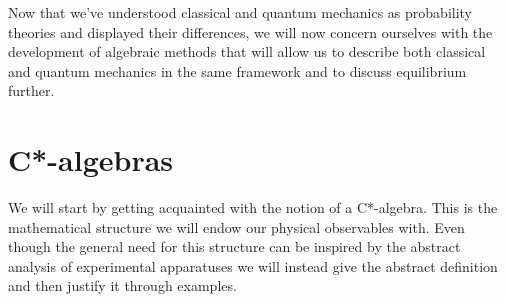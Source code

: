 Now that we've understood classical and quantum mechanics as probability theories and displayed their differences, we will now concern ourselves with the development of algebraic methods that will allow us to describe both classical and quantum mechanics in the same framework and to discuss equilibrium further.
 
\section{C*-algebras}

We will start by getting acquainted with the notion of a C*-algebra. This is the mathematical structure we will endow our physical observables with. Even though the general need for this structure can be inspired by the abstract analysis of experimental apparatuses\cite{Strocchi2008a} we will instead give the abstract definition and then justify it through examples. 

